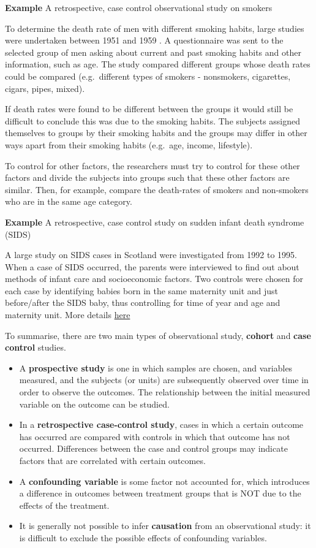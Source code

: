\documentclass[
  oneside]{krantz}
\begin{document}
\textbf{Example} A retrospective, case control observational study on smokers

To determine the death rate of men with different smoking habits, large studies were undertaken between 1951 and 1959 \citeyearpar{Snedecor&Cochran1980}. A questionnaire was sent to the selected group of men asking about current and past smoking habits and other information, such as age. The study compared different groups whose death rates could be compared (e.g.~different types of smokers - nonsmokers, cigarettes, cigars, pipes, mixed).

If death rates were found to be different between the groups it would still be difficult to conclude this was due to the smoking habits. The subjects assigned themselves to groups by their smoking habits and the groups may differ in other ways apart from their smoking habits (e.g.~age, income, lifestyle).

To control for other factors, the researchers must try to control for these other factors and divide the subjects into groups such that these other factors are similar. Then, for example, compare the death-rates of smokers and non-smokers who are in the same age category.

\textbf{Example} A retrospective, case control study on sudden infant death syndrome (SIDS)

A large study on SIDS cases in Scotland were investigated from 1992 to 1995. When a case of SIDS occurred, the parents were interviewed to find out about methods of infant care and socioeconomic factors. Two controls were chosen for each case by identifying babies born in the same maternity unit and just before/after the SIDS baby, thus controlling for time of year and age and maternity unit. More details \href{http://www.sids-network.org/experts/scottish.htm}{here}

To summarise, there are two main types of observational study, \textbf{cohort} and \textbf{case control} studies.

\begin{itemize}
\item
  A \textbf{prospective study} is one in which samples are chosen, and variables measured, and the subjects (or units) are subsequently observed over time in order to observe the outcomes. The relationship between the initial measured variable on the outcome can be studied.
\item
  In a \textbf{retrospective case-control study}, cases in which a certain outcome has occurred are compared with controls in which that outcome has not occurred. Differences between the case and control groups may indicate factors that are correlated with certain outcomes.
\item
  A \textbf{confounding variable} is some factor not accounted for, which introduces a difference in outcomes between treatment groups that is NOT due to the effects of the treatment.
\item
  It is generally not possible to infer \textbf{causation} from an observational study: it is difficult to exclude the possible effects of confounding variables.
\end{itemize}
\end{document}
